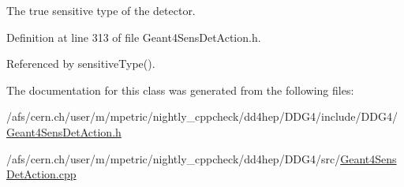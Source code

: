 The true sensitive type of the detector. 

Definition at line 313 of file Geant4SensDetAction.h.

Referenced by sensitiveType().

The documentation for this class was generated from the following files:\begin{DoxyCompactItemize}
\item 
/afs/cern.ch/user/m/mpetric/nightly\_\-cppcheck/dd4hep/DDG4/include/DDG4/\hyperlink{_geant4_sens_det_action_8h}{Geant4SensDetAction.h}\item 
/afs/cern.ch/user/m/mpetric/nightly\_\-cppcheck/dd4hep/DDG4/src/\hyperlink{_geant4_sens_det_action_8cpp}{Geant4SensDetAction.cpp}\end{DoxyCompactItemize}
